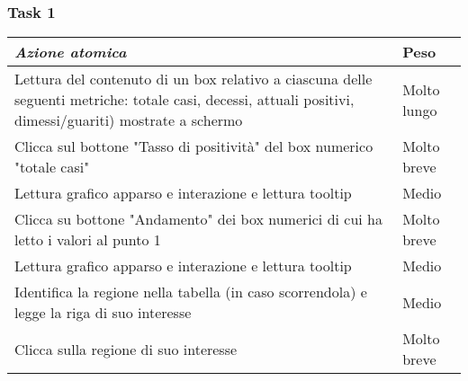\subsubsection{Task 1}
\label{sss:iaa-task-1}
{
\renewcommand{\arraystretch}{2}
\begin{longtable}[h]{| p{14cm} | p{2.5cm} |}
    \hline
    \textit{Azione atomica} & \textbf{Peso} \\
    \hline
    \endhead
    Lettura del contenuto di un box relativo a ciascuna delle seguenti metriche: totale casi, decessi, attuali positivi, dimessi/guariti) mostrate a schermo & Molto lungo \\
    \hline
    Clicca sul bottone "Tasso di positività" del box numerico "totale casi" & Molto breve  \\
    \hline
    Lettura grafico apparso e interazione e lettura tooltip & Medio \\
    \hline
    Clicca su bottone "Andamento" dei box numerici di cui ha letto i valori al punto 1 & Molto breve \\
    \hline
    Lettura grafico apparso e interazione e lettura tooltip & Medio \\
    \hline
    Identifica la regione nella tabella (in caso scorrendola) e legge la riga di suo interesse & Medio \\
    \hline
    Clicca sulla regione di suo interesse & Molto breve \\
    \hline
\end{longtable}
}